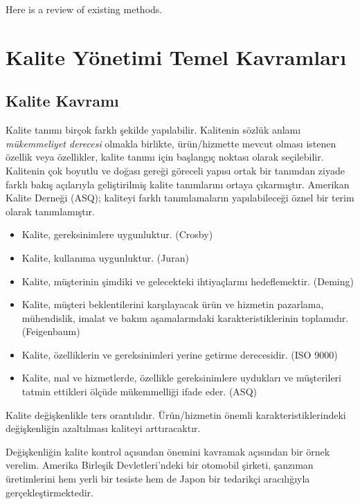 \documentclass[
]{book}
\providecommand{\tightlist}{%
  \setlength{\itemsep}{0pt}\setlength{\parskip}{0pt}}
\begin{document}
Here is a review of existing methods.

\hypertarget{kalite-yuxf6netimi-temel-kavramlarux131}{%
\chapter{Kalite Yönetimi Temel Kavramları}\label{kalite-yuxf6netimi-temel-kavramlarux131}}

\hypertarget{kalite-kavramux131}{%
\section{Kalite Kavramı}\label{kalite-kavramux131}}

Kalite tanımı birçok farklı şekilde yapılabilir. Kalitenin sözlük anlamı \emph{mükemmeliyet derecesi} olmakla birlikte, ürün/hizmette mevcut olması istenen özellik veya özellikler, kalite tanımı için başlangıç noktası olarak seçilebilir. Kalitenin çok boyutlu ve doğası gereği göreceli yapısı ortak bir tanımdan ziyade farklı bakış açılarıyla geliştirilmiş kalite tanımlarını ortaya çıkarmıştır. Amerikan Kalite Derneği (ASQ); kaliteyi farklı tanımlamaların yapılabileceği öznel bir terim olarak tanımlamıştır.

\begin{itemize}
\tightlist
\item
  Kalite, gereksinimlere uygunluktur. (Crosby)
\item
  Kalite, kullanıma uygunluktur. (Juran)
\item
  Kalite, müşterinin şimdiki ve gelecekteki ihtiyaçlarını hedeflemektir. (Deming)
\item
  Kalite, müşteri beklentilerini karşılayacak ürün ve hizmetin pazarlama, mühendislik, imalat ve bakım aşamalarındaki karakteristiklerinin toplamıdır. (Feigenbaum)
\item
  Kalite, özelliklerin ve gereksinimleri yerine getirme derecesidir. (ISO 9000)
\item
  Kalite, mal ve hizmetlerde, özellikle gereksinimlere uydukları ve müşterileri tatmin ettikleri ölçüde mükemmelliği ifade eder. (ASQ)
\end{itemize}

Kalite değişkenlikle ters orantılıdır. Ürün/hizmetin önemli karakteristiklerindeki değişkenliğin azaltılması kaliteyi arttıracaktır.

Değişkenliğin kalite kontrol açısından önemini kavramak açısından bir örnek verelim. Amerika Birleşik Devletleri'ndeki bir otomobil şirketi, şanzıman üretimlerini hem yerli bir tesiste hem de Japon bir tedarikçi aracılığıyla gerçekleştirmektedir.
\end{document}
